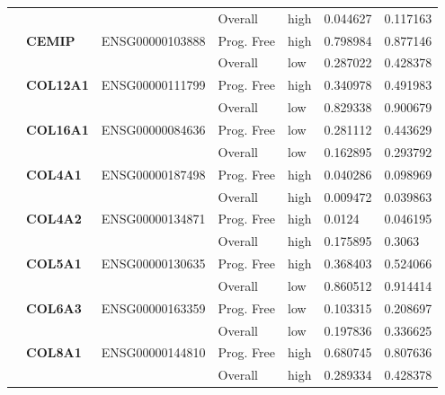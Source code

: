 \begin{spacing}{1}
{\begin{longtable}{|>{\bfseries}p{2cm}|>{\bfseries}p{1.9cm}|p{2.8cm}|p{2cm}|p{2cm}|p{1.5cm}|p{1.5cm}|}
            \hhline{~~~----}
             &          &                 & Overall    & high & 0.044627 & 0.117163 \\
            \hhline{~======}
             & CEMIP    & ENSG00000103888 & Prog. Free & high & 0.798984 & 0.877146 \\
            \hhline{~~~----}
             &          &                 & Overall    & low  & 0.287022 & 0.428378 \\
            \hhline{~======}
             & COL12A1  & ENSG00000111799 & Prog. Free & high & 0.340978 & 0.491983 \\
            \hhline{~~~----}
             &          &                 & Overall    & low  & 0.829338 & 0.900679 \\
            \hhline{~======}
             & COL16A1  & ENSG00000084636 & Prog. Free & low  & 0.281112 & 0.443629 \\
            \hhline{~~~----}
             &          &                 & Overall    & low  & 0.162895 & 0.293792 \\
            \hhline{~======}
             & COL4A1   & ENSG00000187498 & Prog. Free & high & 0.040286 & 0.098969 \\
            \hhline{~~~----}
             &          &                 & Overall    & high & 0.009472 & 0.039863 \\
            \hhline{~======}
             & COL4A2   & ENSG00000134871 & Prog. Free & high & 0.0124   & 0.046195 \\
            \hhline{~~~----}
             &          &                 & Overall    & high & 0.175895 & 0.3063   \\
            \hhline{~======}
             & COL5A1   & ENSG00000130635 & Prog. Free & high & 0.368403 & 0.524066 \\
            \hhline{~~~----}
             &          &                 & Overall    & low  & 0.860512 & 0.914414 \\
            \hhline{~======}
             & COL6A3   & ENSG00000163359 & Prog. Free & low  & 0.103315 & 0.208697 \\
            \hhline{~~~----}
             &          &                 & Overall    & low  & 0.197836 & 0.336625 \\
            \hhline{~======}
             & COL8A1   & ENSG00000144810 & Prog. Free & high & 0.680745 & 0.807636 \\
            \hhline{~~~----}
             &          &                 & Overall    & high & 0.289334 & 0.428378 \\

\end{longtable}}
\end{spacing}
